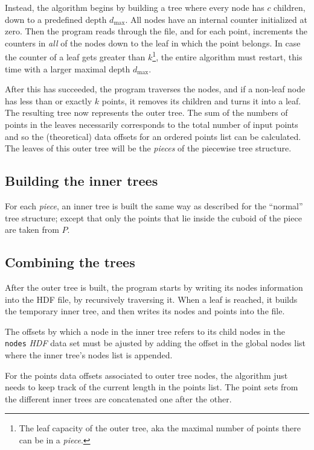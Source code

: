 \documentclass[a4paper,10pt,abstracton,notitlepage]{scrreprt}
\begin{document}
Instead, the algorithm begins by building a tree where every node has $c$ children, down to a predefined depth $d_{\max}$. All nodes have an internal counter initialized at zero. Then the program reads through the file, and for each point, increments the counters in \emph{all} of the nodes down to the leaf in which the point belongs. In case the counter of a leaf gets greater than $k$\footnote{The leaf capacity of the outer tree, aka the maximal number of points there can be in a \emph{piece}.}, the entire algorithm must restart, this time with a larger maximal depth $d_{\max}$.

After this has succeeded, the program traverses the nodes, and if a non-leaf node has less than or exactly $k$ points, it removes its children and turns it into a leaf. The resulting tree now represents the outer tree. The sum of the numbers of points in the leaves necessarily corresponds to the total number of input points and so the (theoretical) data offsets for an ordered points list can be calculated. The leaves of this outer tree will be the \emph{pieces} of the piecewise tree structure.

\subsection{Building the inner trees}
For each \emph{piece}, an inner tree is built the same way as described for the ``normal'' tree structure; except that only the points that lie inside the cuboid of the piece are taken from $P$.

\subsection{Combining the trees}
After the outer tree is built, the program starts by writing its nodes information into the HDF file, by recursively traversing it. When a leaf is reached, it builds the temporary inner tree, and then writes its nodes and points into the file.

The offsets by which a node in the inner tree refers to its child nodes in the \texttt{nodes} \emph{HDF} data set must be ajusted by adding the offset in the global nodes list where the inner tree's nodes list is appended.

For the points data offsets associated to outer tree nodes, the algorithm just needs to keep track of the current length in the points list. The point sets from the different inner trees are concatenated one after the other.
\end{document}
